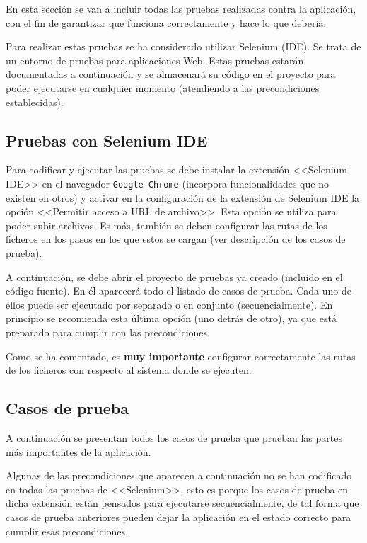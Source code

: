 En esta sección se van a incluir todas las pruebas realizadas contra la
aplicación, con el fin de garantizar que funciona correctamente y hace lo que
debería.

Para realizar estas pruebas se ha considerado utilizar Selenium (IDE). Se trata
de un entorno de pruebas para aplicaciones Web. Estas pruebas estarán
documentadas a continuación y se almacenará su código en el proyecto para poder
ejecutarse en cualquier momento (atendiendo a las precondiciones establecidas).

\subsection{Pruebas con Selenium IDE}

Para codificar y ejecutar las pruebas se debe instalar la extensión <<Selenium
IDE>> en el navegador \texttt{Google Chrome} (incorpora funcionalidades que no
existen en otros) y activar en la configuración de la extensión de Selenium IDE
la opción <<Permitir acceso a URL de archivo>>. Esta opción se utiliza para
poder subir archivos. Es más, también se deben configurar las rutas de los
ficheros en los pasos en los que estos se cargan (ver descripción de los casos de prueba).

A continuación, se debe abrir el proyecto de pruebas ya creado (incluido en el
código fuente). En él aparecerá todo el listado de casos de prueba. Cada uno de
ellos puede ser ejecutado por separado o en conjunto (secuencialmente). En
principio se recomienda esta última opción (uno detrás de otro), ya que está
preparado para cumplir con las precondiciones.

Como se ha comentado, es \textbf{muy importante} configurar correctamente las
rutas de los ficheros con respecto al sistema donde se ejecuten.


\subsection{Casos de prueba}

A continuación se presentan todos los casos de prueba que prueban las partes más
importantes de la aplicación.

Algunas de las precondiciones que aparecen a continuación no se han codificado
en todas las pruebas de <<Selenium>>, esto es porque los casos de prueba en
dicha extensión están pensados para ejecutarse secuencialmente, de tal forma que
casos de prueba anteriores pueden dejar la aplicación en el estado correcto para
cumplir esas precondiciones.


